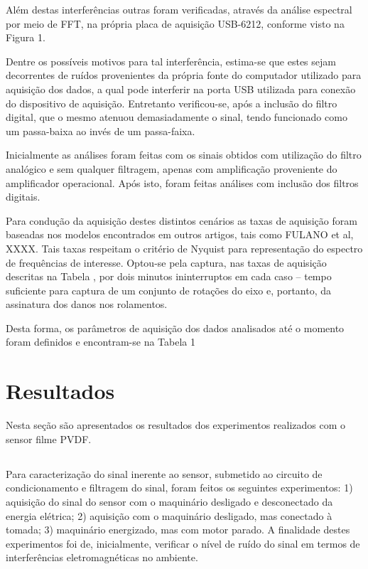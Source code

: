 \documentclass[
	12pt,				
	oneside,			
	a4paper,			
	english,			
	brazil,			
	]{abntex2ppgsi}
\begin{document}
Além destas interferências outras foram verificadas, através da análise espectral por meio de FFT, na própria placa de aquisição USB-6212, conforme visto na Figura 1.

Dentre os possíveis motivos para tal interferência, estima-se que estes sejam decorrentes de ruídos provenientes da própria fonte do computador utilizado para aquisição dos dados, a qual pode interferir na porta USB utilizada para conexão do dispositivo de aquisição. Entretanto verificou-se, após a inclusão do filtro digital, que o mesmo atenuou demasiadamente o sinal, tendo funcionado como um passa-baixa ao invés de um passa-faixa. 

Inicialmente as análises foram feitas com os sinais obtidos com utilização do filtro analógico e sem qualquer filtragem, apenas com amplificação proveniente do amplificador operacional. Após isto, foram feitas análises com inclusão dos filtros digitais. 

Para condução da aquisição destes distintos cenários as taxas de aquisição foram baseadas nos modelos encontrados em outros artigos, tais como FULANO et al, XXXX. Tais taxas respeitam o critério de Nyquist para representação do espectro de frequências de interesse. Optou-se pela captura, nas taxas de aquisição descritas na Tabela , por dois minutos ininterruptos em cada caso – tempo suficiente para captura de um conjunto de rotações do eixo e, portanto, da assinatura dos danos nos rolamentos. 

Desta forma, os parâmetros de aquisição dos dados analisados até o momento foram definidos e encontram-se na Tabela 1

\chapter{Resultados}

Nesta seção são apresentados os resultados dos experimentos realizados com o sensor filme PVDF.

\section{}

Para caracterização do sinal inerente ao sensor, submetido ao circuito de condicionamento e filtragem do sinal, foram feitos os seguintes experimentos: 1) aquisição do sinal do sensor com o maquinário desligado e desconectado da energia elétrica; 2) aquisição com o maquinário desligado, mas conectado à tomada; 3) maquinário energizado, mas com motor parado. A finalidade destes experimentos foi de, inicialmente, verificar o nível de ruído do sinal em termos de interferências eletromagnéticas no ambiente.
\end{document}
